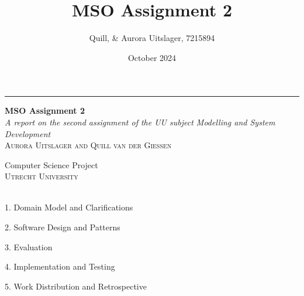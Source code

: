 \documentclass[a4paper, 11pt, oneside]{book} %
\title{MSO Assignment 2}
\author{Quill, \& Aurora Uitslager, 7215894}
\date{October 2024}
\begin{document}
\begin{titlepage} %
	
	\raggedleft %
	
	\rule{1pt}{\textheight} %
	\hspace{0.05\textwidth} %
	\parbox[b]{0.75\textwidth}{ %
		
		{\Huge \bfseries MSO Assignment 2}\\[2\baselineskip] %
		{\large\textit{A report on the second assignment of the UU subject Modelling and System Development}}\\[4\baselineskip] %
		{\Large\textsc{Aurora Uitslager and Quill van der Giessen}} %
		
		\vspace{0.5\textheight} %
		
		{\noindent \small Computer Science Project \\ \large \textsc{Utrecht University}~~\\}\\[\baselineskip] %
	}

\end{titlepage}

{1. Domain Model and Clarifications}

{2. Software Design and Patterns}

{3. Evaluation}

{4. Implementation and Testing}

{5. Work Distribution and Retrospective}
\end{document}
